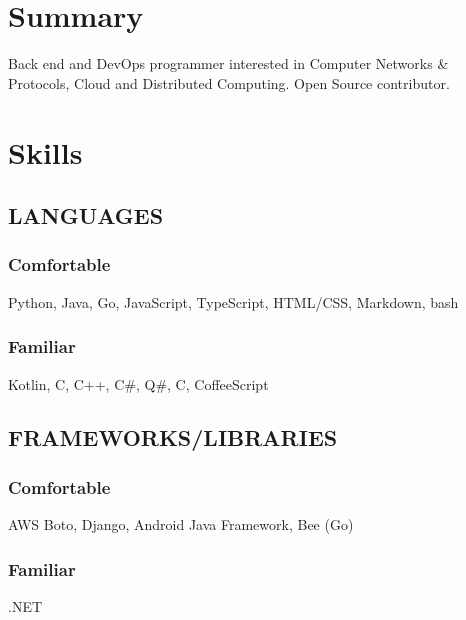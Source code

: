 \documentclass[letterpaper]{deedy-resume} %
\begin{document}
\begin{minipage}[t]{0.33\textwidth} %


\section{Summary}
Back end and DevOps programmer interested in Computer Networks \& Protocols, Cloud and Distributed Computing. Open Source contributor.
\sectionspace %

\section{Skills}
\subsection{LANGUAGES}
\subsubsection*{Comfortable}
\squeezeup
Python, Java, Go, JavaScript, TypeScript, HTML/CSS, Markdown, bash
\subsectionspace %
\subsubsection*{Familiar}
\squeezeup
Kotlin, C, C++, C\#, Q\#, C, CoffeeScript

\sectionspace %

\subsection{FRAMEWORKS/LIBRARIES}
\subsubsection*{Comfortable}
\squeezeup
AWS Boto, Django, Android Java Framework, Bee (Go)
\subsectionspace %
\subsubsection*{Familiar}
\squeezeup
.NET

\sectionspace %


\end{minipage}
\end{document}
